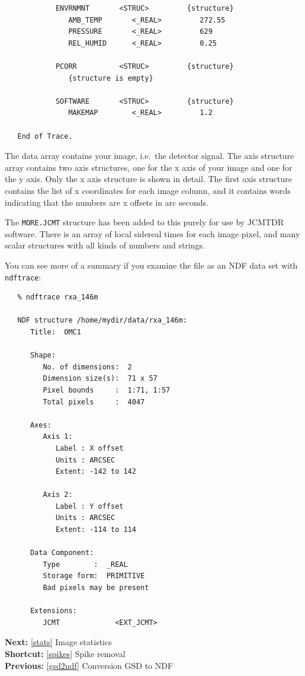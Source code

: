 \documentclass[11pt]{article}
\newenvironment{latexonly}{}{}
\newcommand{\htmlref}[2]{#1}
\newcommand{\xref}[3]{#1}
\begin{document}
\begin{verbatim}
            ENVRNMNT       <STRUC>         {structure}
               AMB_TEMP       <_REAL>         272.55
               PRESSURE       <_REAL>         629
               REL_HUMID      <_REAL>         0.25

            PCORR          <STRUC>         {structure}
               {structure is empty}

            SOFTWARE       <STRUC>         {structure}
               MAKEMAP        <_REAL>         1.2

   End of Trace.
\end{verbatim}

   The data array contains your image, i.e.\ the detector signal. The axis
   structure array contains two axis structures, one for the x axis of your
   image and one for the y axis. Only the x axis structure is shown in
   detail. The first axis structure contains the list of x coordinates
   for each image column, and it contains words indicating that the
   numbers are x offsets in arc seconds.

   The {\tt MORE.JCMT} structure has been added to this purely for use
   by JCMTDR software. There is an array of local sidereal times for each
   image pixel, and many scalar structures with all kinds of numbers and
   strings.

   You can see more of a summary if you examine the file as an
\htmlref{NDF data set}{glossndf}
   with
{\tt \xref{ndftrace}{sun95}{NDFTRACE}}:

\begin{verbatim}
   % ndftrace rxa_146m

   NDF structure /home/mydir/data/rxa_146m:
      Title:  OMC1

      Shape:
         No. of dimensions:  2
         Dimension size(s):  71 x 57
         Pixel bounds     :  1:71, 1:57
         Total pixels     :  4047

      Axes:
         Axis 1:
            Label : X offset
            Units : ARCSEC
            Extent: -142 to 142

         Axis 2:
            Label : Y offset
            Units : ARCSEC
            Extent: -114 to 114

      Data Component:
         Type        :  _REAL
         Storage form:  PRIMITIVE
         Bad pixels may be present

      Extensions:
         JCMT             <EXT_JCMT>
\end{verbatim}

\begin{latexonly}
{\bf Next:} \ref{stats} Image statistics\\
{\bf Shortcut:} \ref{spikes} Spike removal\\
{\bf Previous:} \ref{gsd2ndf} Conversion GSD to NDF\\
\end{latexonly}
\end{document}
